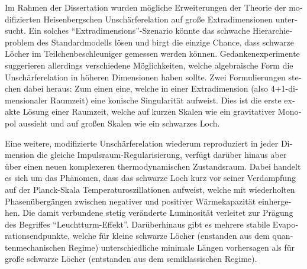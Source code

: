 \begin{otherlanguage}{german}
\begin{fullwidth}
\begin{center}
\begin{adjustwidth}{1cm}{1cm}
Im Rahmen der Dissertation wurden mögliche Erweiterungen der Theorie der
modifizierten Heisenbergschen Unschärferelation auf große Extradimensionen
untersucht. Ein solches ``Extradimensions''-Szenario
könnte das schwache Hierarchieproblem des Standardmodells lösen und birgt
die einzige Chance, dass schwarze Löcher im Teilchenbeschleuniger gemessen
werden können.
Gedankenexperimente suggerieren allerdings verschiedene Möglichkeiten,
welche algebraische Form die Unschärfe\-re\-lation in höheren Dimensionen
haben sollte. Zwei Formulierungen stechen dabei heraus: Zum einen eine,
welche in einer Extradimension (also 4+1-dimensionaler Raumzeit) eine
konische Singularität aufweist. Dies ist die erste exakte Lösung einer
Raumzeit, welche auf kurzen Skalen wie ein gravitativer Monopol aussieht
und auf großen Skalen wie ein schwarzes Loch.

Eine weitere, modifizierte Unschärferelation wiederum reproduziert in
jeder Dimension die gleiche Impulsraum-Regularisierung, verfügt darüber
hinaus aber über einen neuen komplexeren thermodynamischen Zustandsraum.
Dabei handelt es sich um das Phänomen, dass
das schwarze Loch kurz vor seiner
Verdampfung auf der Planck-Skala Temperaturoszillationen aufweist,
welche mit wiederholten Phasenübergängen zwischen negativer und positiver
Wärmekapazität einhergehen. Die damit verbundene stetig veränderte
Luminosität verleitet zur Prägung des Begriffes ``Leuchtturm-Effekt''.
Darüberhinaus gibt es mehrere stabile Evaporationsendpunkte, welche
für kleine schwarze Löcher (enstanden aus dem quantenmechanischen
Regime) unterschiedliche minimale Längen vorhersagen als für
große schwarze Löcher (entstanden aus dem semiklassischen Regime).

\end{adjustwidth}
\end{center}
\end{fullwidth}
\end{otherlanguage}
